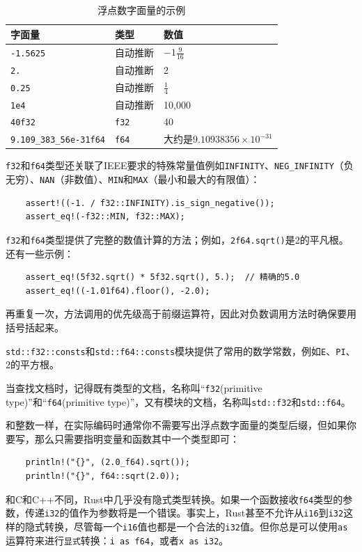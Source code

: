 \begin{table}[htbp]
    \centering
    \caption{浮点数字面量的示例}
    \label{t3-9}
    \begin{tabular}{lll}
        \hline
        \textbf{字面量} & \textbf{类型} & \textbf{数值} \\
        \hline
        \texttt{-1.5625}    & 自动推断  & $-1\frac{9}{16}$  \\
        \rowcolor{tablecolor}
        \texttt{2.}         & 自动推断  & 2 \\
        \texttt{0.25}       & 自动推断  & $\frac{1}{4}$   \\
        \rowcolor{tablecolor}
        \texttt{1e4}        & 自动推断  & 10,000    \\
        \texttt{40f32}      & \texttt{f32}  & 40    \\
        \rowcolor{tablecolor}
        \texttt{9.109\_383\_56e-31f64} & \texttt{f64} & 大约是$9.10938356\times10^{-31}$ \\
    \end{tabular}
\end{table}

\texttt{f32}和\texttt{f64}类型还关联了IEEE要求的特殊常量值例如\texttt{INFINITY}、\texttt{NEG\_INFINITY}（负无穷）、\texttt{NAN}（非数值）、\texttt{MIN}和\texttt{MAX}（最小和最大的有限值）：
\begin{verbatim}
    assert!((-1. / f32::INFINITY).is_sign_negative());
    assert_eq!(-f32::MIN, f32::MAX);
\end{verbatim}
\texttt{f32}和\texttt{f64}类型提供了完整的数值计算的方法；例如，\texttt{2f64.sqrt()}是2的平凡根。还有一些示例：
\begin{verbatim}
    assert_eq!(5f32.sqrt() * 5f32.sqrt(), 5.);  // 精确的5.0
    assert_eq!((-1.01f64).floor(), -2.0);
\end{verbatim}

再重复一次，方法调用的优先级高于前缀运算符，因此对负数调用方法时确保要用括号括起来。

\texttt{std::f32::consts}和\texttt{std::f64::consts}模块提供了常用的数学常数，例如\texttt{E}、\texttt{PI}、2的平方根。

当查找文档时，记得既有类型的文档，名称叫“\texttt{f32}(primitive type)”和“\texttt{f64}(primitive type)”，又有模块的文档，名称叫\texttt{std::f32}和\texttt{std::f64}。

和整数一样，在实际编码时通常你不需要写出浮点数字面量的类型后缀，但如果你要写，那么只需要指明变量和函数其中一个类型即可：
\begin{verbatim}
    println!("{}", (2.0_f64).sqrt());
    println!("{}", f64::sqrt(2.0));
\end{verbatim}
和C和C++不同，Rust中几乎没有隐式类型转换。如果一个函数接收\texttt{f64}类型的参数，传递\texttt{i32}的值作为参数将是一个错误。事实上，Rust甚至不允许从\texttt{i16}到\texttt{i32}这样的隐式转换，尽管每一个\texttt{i16}值也都是一个合法的\texttt{i32}值。但你总是可以使用\texttt{as}运算符来进行\texttt{显式}转换：\texttt{i as f64}，或者\texttt{x as i32}。

